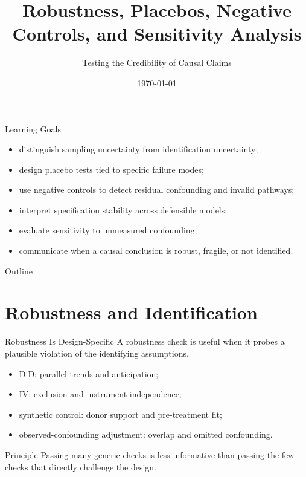 \documentclass[aspectratio=169,11pt]{beamer}
\title[Robustness and Sensitivity]{Robustness, Placebos, Negative Controls, and Sensitivity Analysis}
\subtitle{Testing the Credibility of Causal Claims}
\date{\today}
\begin{document}
\begin{frame}
\titlepage
\end{frame}

\begin{frame}{Learning Goals}
\begin{itemize}
\item distinguish sampling uncertainty from identification uncertainty;
\item design placebo tests tied to specific failure modes;
\item use negative controls to detect residual confounding and invalid pathways;
\item interpret specification stability across defensible models;
\item evaluate sensitivity to unmeasured confounding;
\item communicate when a causal conclusion is robust, fragile, or not identified.
\end{itemize}
\end{frame}

\begin{frame}{Outline}
\tableofcontents
\end{frame}

\section{Robustness and Identification}

\begin{frame}{Robustness Is Design-Specific}
A robustness check is useful when it probes a plausible violation of the identifying assumptions.

\begin{itemize}
\item DiD: parallel trends and anticipation;
\item IV: exclusion and instrument independence;
\item synthetic control: donor support and pre-treatment fit;
\item observed-confounding adjustment: overlap and omitted confounding.
\end{itemize}

\begin{alertblock}{Principle}
Passing many generic checks is less informative than passing the few checks that directly challenge the design.
\end{alertblock}
\end{frame}
\end{document}
